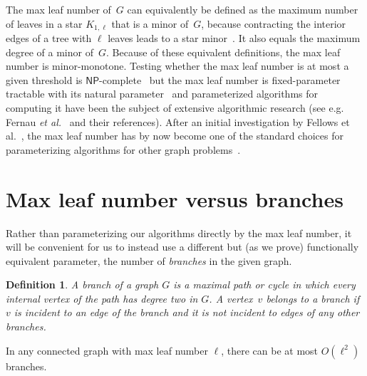 \documentclass{jgaa-art}
\newtheorem{definition}{Definition}
\begin{document}
The max leaf number of~$G$ can equivalently be defined as the maximum number of leaves in a star $K_{1,\ell}$ that is a minor of~$G$, because contracting the interior edges of a tree with $\ell$ leaves leads to a star minor~\cite{FelLan-SJDM-92}. It also equals the maximum degree of a minor of~$G$. Because of these equivalent definitions, the max leaf number is minor-monotone. 
Testing whether the max leaf number is at most a given threshold is $\mathsf{NP}$-complete~\cite[ND4, p. 206]{GarJoh-79} but the max leaf number is fixed-parameter tractable with its natural parameter~\cite{FelLan-SJDM-92} and parameterized algorithms for computing it have been the subject of extensive algorithmic research (see e.g. Fernau \emph{et al.}~\cite{FerJoaDie-TCS-11} and their references).
After an initial investigation by Fellows et al.~\cite{FelLokNus-TCS-09},
the max leaf number has by now become one of the standard choices for parameterizing algorithms for other graph problems~\cite{AdiChiSau-ISAAC-10,BodJanKra-TCS-13,FelHerRos-ESA-13,Lam-Algo-12,Lam-LMCS-14}.

\section{Max leaf number versus branches}

Rather than parameterizing our algorithms directly by the max leaf number, it will be convenient for us to instead use a different but (as we prove) functionally equivalent parameter, the number of \emph{branches} in the given graph.

\begin{definition}
A \emph{branch} of a graph $G$ is a maximal path or cycle in which every internal vertex of the path has degree two in $G$. A vertex~$v$ \emph{belongs} to a branch if $v$ is incident to an edge of the branch and it is not incident to edges of any other branches.
\end{definition}

\begin{lemma}
\label{lem:branch-upper-bound-by-leaf}
In any connected graph with max leaf number $\ell$, there can be at most $O(\ell^2)$ branches.
\end{lemma}
\end{document}
